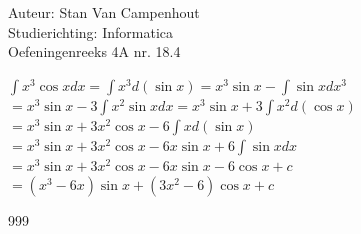 \documentclass[a4paper]{article}
\begin{document}
  
\noindent \large Auteur: Stan Van Campenhout \\
\noindent \large Studierichting:  Informatica\\
\noindent \large Oefeningenreeks 4A nr. 18.4\\

\medskip

\normalsize

$ \displaystyle\int x^3 \cos x dx = \displaystyle\int x^3 d\left(\sin x\right) = x^3\sin x - \displaystyle\int\sin x dx^3 $\\

$ =  x^3\sin x - 3\displaystyle\int x^2\sin x dx = x^3\sin x + 3\displaystyle\int x^2 d\left(\cos x\right) $\\

$ =  x^3\sin x + 3x^2\cos x - 6\displaystyle\int x d\left(\sin x\right) $\\

$ = x^3\sin x + 3x^2\cos x - 6x\sin x + 6\displaystyle\int\sin x dx $\\

$ = x^3\sin x + 3x^2\cos x - 6x\sin x -6\cos x + c $\\

$ = \left(x^3 - 6x\right)\sin x + \left(3x^2 - 6\right)\cos x + c $\\

\begin{thebibliography}{999}
\end{thebibliography}
\end{document}

